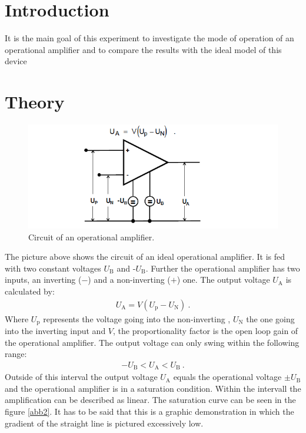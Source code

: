 \section{Introduction}
It is the main goal of this experiment to investigate the mode of operation of an operational amplifier and to compare the results with the ideal model of this device

\section{Theory}
\FloatBarrier
\begin{figure}
  \centering
  \includegraphics[scale=0.5]{opamp.PNG}
  \caption{Circuit of an operational amplifier. \cite{Q1}}
  \label{abb1}
\end{figure}
\FloatBarrier
The picture above shows the circuit of an ideal operational amplifier. It is
fed with two constant voltages $U_{\text{B}}$ and -$U_{\text{B}}$.
Further the operational amplifier has two inputs, an inverting ($-$) and a
non-inverting ($+$) one. The output voltage $U_{\text{A}}$ is calculated by:
\begin{align}
    U_{\text{A}} = V(U_{\text{p}}-U_{\text{N}}) \ .
    \label{eq:outputvoltage}
\end{align}
Where $U_{\text{p}}$ represents the voltage going into the non-inverting ,
$U_{\text{N}}$ the one going into the inverting input and $V$, the proportionality
factor is the open loop gain of the operational amplifier.
The output voltage can only swing within the following range:
\begin{align*}
    -U_{\text{B}} < U_{\text{A}} < U_{\text{B}} \ .
\end{align*}
Outside of this interval the output voltage $U_{\text{A}}$ equals the operational
voltage $\pm U_{\text{B}}$ and the operational amplifier is in a saturation
condition. Within the intervall the amplification can be described as
linear.
The saturation curve can be seen in the figure \ref{abb2}. It has to be said that this is a graphic demonstration in which the gradient of the straight line is pictured excessively low.

